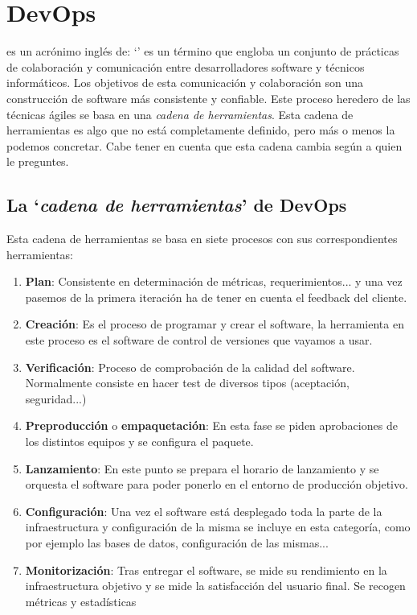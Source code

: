 \section{DevOps}

 es un acrónimo inglés de: `' es un término que engloba un conjunto de prácticas de colaboración y comunicación entre desarrolladores software y técnicos informáticos. Los objetivos de esta comunicación y colaboración son una construcción de software más consistente y confiable. Este proceso heredero de las técnicas ágiles se basa en una \textit{cadena de herramientas}. Esta cadena de herramientas es algo que no está completamente definido, pero más o menos la podemos concretar. Cabe tener en cuenta que esta cadena cambia según a quien le preguntes.

\subsection{La `\emph{cadena de herramientas}' de DevOps}

Esta cadena de herramientas se basa en siete procesos con sus correspondientes herramientas:

\begin{enumerate}
 \item \textbf{Plan}: Consistente en determinación de métricas, requerimientos... y una vez pasemos de la primera iteración ha de tener en cuenta el feedback del cliente.
 \item \textbf{Creación}: Es el proceso de programar y crear el software, la herramienta en este proceso es el software de control de versiones que vayamos a usar.
 \item \textbf{Verificación}: Proceso de comprobación de la calidad del software. Normalmente consiste en hacer test de diversos tipos (aceptación, seguridad...)
 \item \textbf{Preproducción} o \textbf{empaquetación}: En esta fase se piden aprobaciones de los distintos equipos y se configura el paquete.
 \item \textbf{Lanzamiento}: En este punto se prepara el horario de lanzamiento y se orquesta el software para poder ponerlo en el entorno de producción objetivo.
 \item \textbf{Configuración}: Una vez el software está desplegado toda la parte de la infraestructura y configuración de la misma se incluye en esta categoría, como por ejemplo las bases de datos, configuración de las mismas...
 \item \textbf{Monitorización}: Tras entregar el software, se mide su rendimiento en la infraestructura objetivo y se mide la satisfacción del usuario final. Se recogen métricas y estadísticas
\end{enumerate}


